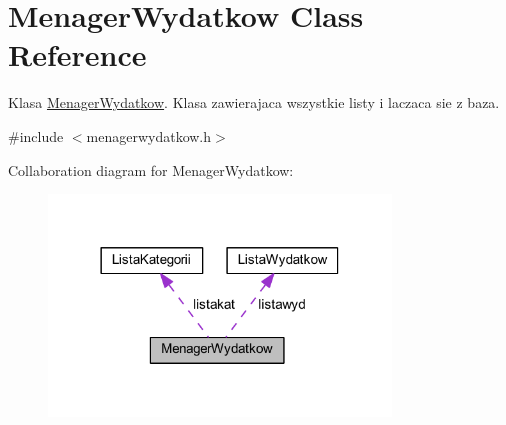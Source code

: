 \hypertarget{class_menager_wydatkow}{}\section{Menager\+Wydatkow Class Reference}
\label{class_menager_wydatkow}


Klasa \hyperlink{class_menager_wydatkow}{Menager\+Wydatkow}. Klasa zawierajaca wszystkie listy i laczaca sie z baza.  




{\ttfamily \#include $<$menagerwydatkow.\+h$>$}



Collaboration diagram for Menager\+Wydatkow\+:\nopagebreak
\begin{figure}[H]
\begin{center}
\leavevmode
\includegraphics[width=258pt]{class_menager_wydatkow__coll__graph}
\end{center}
\end{figure}
